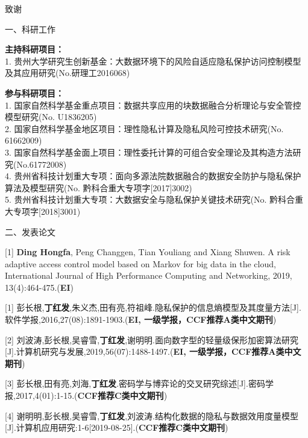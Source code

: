 \documentclass[pdftex,notypeinfo,twoside,openany,UTF8,fntef]{CASthesis}
\begin{document}
%




\begin{thanks}

致谢

\end{thanks}

\newpage
{}  %

\begin{resumesection}{一、科研工作}

\textbf{主持科研项目：}\\
1. 贵州大学研究生创新基金：大数据环境下的风险自适应隐私保护访问控制模型及其应用研究(No.研理工2016068)

\textbf{参与科研项目：}\\
1. 国家自然科学基金重点项目：数据共享应用的块数据融合分析理论与安全管控模型研究(No. U1836205)\\
2. 国家自然科学基金地区项目：理性隐私计算及隐私风险可控技术研究(No. 61662009)\\
3.  国家自然科学基金面上项目：理性委托计算的可组合安全理论及其构造方法研究(No.61772008)\\
4. 贵州省科技计划重大专项：面向多源法院数据融合的数据安全防护与隐私保护算法及模型研究(No. 黔科合重大专项字[2017]3002)\\
5. 贵州省科技计划重大专项：大数据安全与隐私保护关键技术研究(No. 黔科合重大专项字[2018]3001)

\end{resumesection}

\begin{resumelist}{二、发表论文}

[1] \textbf{Ding Hongfa}, Peng Changgen, Tian Youliang and Xiang Shuwen. A risk adaptive access control model based on Markov for big data in the cloud, International Journal of High Performance Computing and Networking, 2019, 13(4):464-475.(\textbf{EI})

[1] 彭长根,\textbf{丁红发},朱义杰,田有亮,符祖峰.隐私保护的信息熵模型及其度量方法[J].软件学报,2016,27(08):1891-1903.(\textbf{EI, 一级学报，CCF推荐A类中文期刊})

[2] 刘波涛,彭长根,吴睿雪,\textbf{丁红发},谢明明.面向数字型的轻量级保形加密算法研究[J].计算机研究与发展,2019,56(07):1488-1497.(\textbf{EI, 一级学报，CCF推荐A类中文期刊})
 
[3]  彭长根,田有亮,刘海,\textbf{丁红发}.密码学与博弈论的交叉研究综述[J].密码学报,2017,4(01):1-15.(\textbf{CCF推荐C类中文期刊})

[4] 谢明明,彭长根,吴睿雪,\textbf{丁红发},刘波涛.结构化数据的隐私与数据效用度量模型[J].计算机应用研究:1-6[2019-08-25].(\textbf{CCF推荐C类中文期刊})

\end{resumelist}
\end{document}
